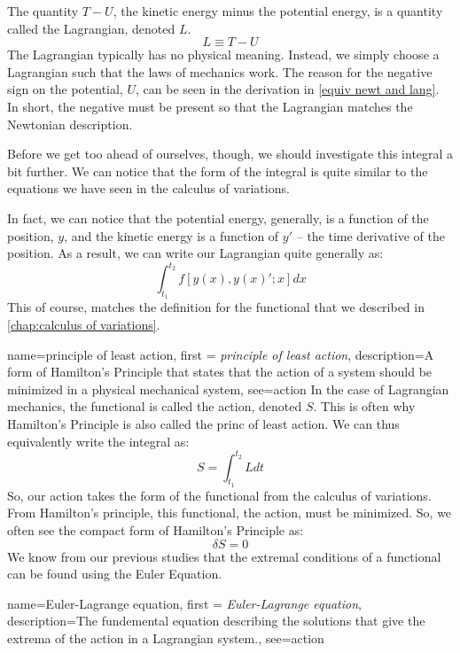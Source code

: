 The quantity $T-U$, the kinetic energy minus the potential energy, is a quantity called the \gls{Lagrangian}, denoted $L$. 
\begin{equation}
    L\equiv T-U
\end{equation}
The \gls{Lagrangian} typically has no physical meaning. Instead, we simply choose a \gls{Lagrangian} such that the laws of mechanics work. The reason for the negative sign on the potential, $U$, can be seen in the derivation in \autoref{equiv newt and lang}. In short, the negative must be present so that the \gls{Lagrangian} matches the Newtonian description.

Before we get too ahead of ourselves, though, we should investigate this integral a bit further. We can notice that the form of the integral is quite similar to the equations we have seen in the calculus of variations.

In fact, we can notice that the potential energy, generally, is a function of the position, $y$, and the kinetic energy is a function of $y'$ -- the time derivative of the position. As a result, we can write our \gls{Lagrangian} quite generally as:
$$\int_{t_1}^{t_2}f[y(x),y(x)';x]dx$$
This of course, matches the definition for the functional that we described in \autoref{chap:calculus of variations}.

{
    name=principle of least action,
    first = {\textit{principle of least action}},
    description={A form of Hamilton's Principle that states that the action of a system should be minimized in a physical mechanical system},
    see={action}
}
In the case of \gls{Lagrangian} mechanics, the functional is called the \gls{action}, denoted $S$. This is often why Hamilton's Principle is also called the \gls{princ of least action}.  We can thus equivalently write the integral as:
\begin{equation}
    S=\int_{t_1}^{t_2}{L}{dt}
\end{equation}
So, our \gls{action} takes the form of the \gls{functional} from the calculus of variations. From Hamilton's principle, this \gls{functional}, the \gls{action}, must be minimized. So, we often see the compact form of Hamilton's Principle as:
$$\delta S=0$$
We know from our previous studies that the extremal conditions of a functional can be found using the \gls{Euler Equation}.

{
    name=Euler-Lagrange equation,
    first = {\textit{Euler-Lagrange equation}},
    description={The fundemental equation describing the solutions that give the extrema of the action in a Lagrangian system.},
    see={action}
}

